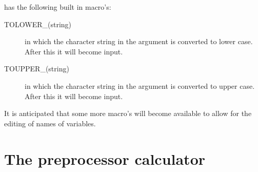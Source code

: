 \noindent \FORM{} has the following built in macro's:
\begin{description}
\item[TOLOWER\_(string)] in which the character string in the argument is 
converted to lower case. After this it will become input.
\item[TOUPPER\_(string)] in which the character string in the argument is 
converted to upper case. After this it will become input.
\end{description}
It is anticipated that some more macro's will become available to allow for 
the editing of names of variables.

\section{The preprocessor calculator}
\label{calculator}

